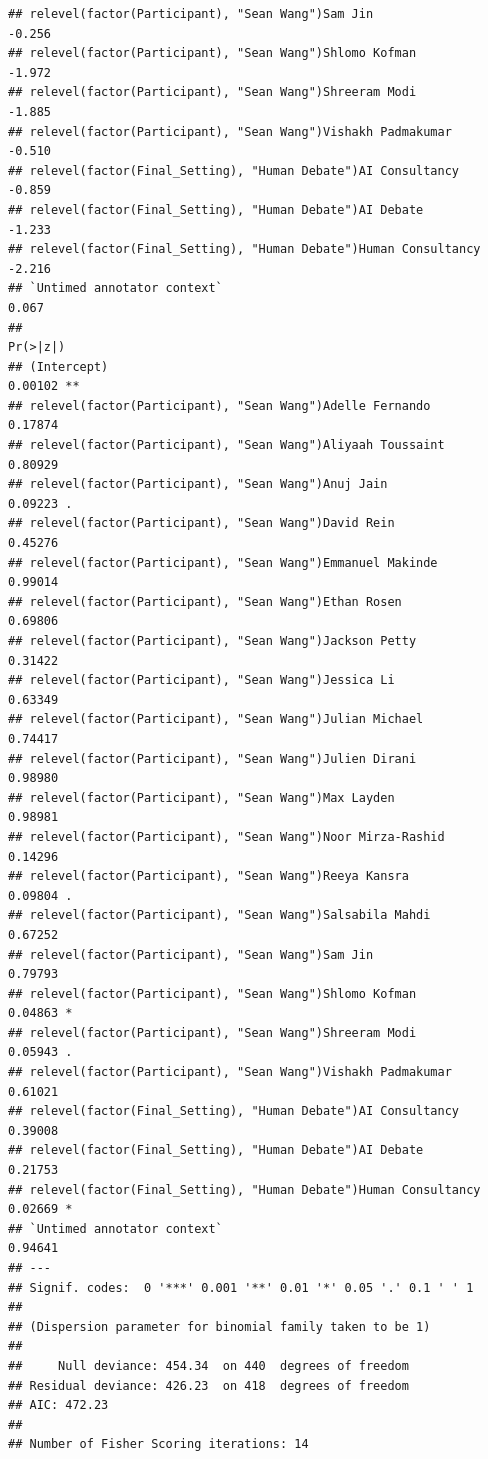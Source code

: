 \documentclass[
]{article}
\begin{document}
\begin{verbatim}
## relevel(factor(Participant), "Sean Wang")Sam Jin                 -0.256
## relevel(factor(Participant), "Sean Wang")Shlomo Kofman           -1.972
## relevel(factor(Participant), "Sean Wang")Shreeram Modi           -1.885
## relevel(factor(Participant), "Sean Wang")Vishakh Padmakumar      -0.510
## relevel(factor(Final_Setting), "Human Debate")AI Consultancy     -0.859
## relevel(factor(Final_Setting), "Human Debate")AI Debate          -1.233
## relevel(factor(Final_Setting), "Human Debate")Human Consultancy  -2.216
## `Untimed annotator context`                                       0.067
##                                                                 Pr(>|z|)   
## (Intercept)                                                      0.00102 **
## relevel(factor(Participant), "Sean Wang")Adelle Fernando         0.17874   
## relevel(factor(Participant), "Sean Wang")Aliyaah Toussaint       0.80929   
## relevel(factor(Participant), "Sean Wang")Anuj Jain               0.09223 . 
## relevel(factor(Participant), "Sean Wang")David Rein              0.45276   
## relevel(factor(Participant), "Sean Wang")Emmanuel Makinde        0.99014   
## relevel(factor(Participant), "Sean Wang")Ethan Rosen             0.69806   
## relevel(factor(Participant), "Sean Wang")Jackson Petty           0.31422   
## relevel(factor(Participant), "Sean Wang")Jessica Li              0.63349   
## relevel(factor(Participant), "Sean Wang")Julian Michael          0.74417   
## relevel(factor(Participant), "Sean Wang")Julien Dirani           0.98980   
## relevel(factor(Participant), "Sean Wang")Max Layden              0.98981   
## relevel(factor(Participant), "Sean Wang")Noor Mirza-Rashid       0.14296   
## relevel(factor(Participant), "Sean Wang")Reeya Kansra            0.09804 . 
## relevel(factor(Participant), "Sean Wang")Salsabila Mahdi         0.67252   
## relevel(factor(Participant), "Sean Wang")Sam Jin                 0.79793   
## relevel(factor(Participant), "Sean Wang")Shlomo Kofman           0.04863 * 
## relevel(factor(Participant), "Sean Wang")Shreeram Modi           0.05943 . 
## relevel(factor(Participant), "Sean Wang")Vishakh Padmakumar      0.61021   
## relevel(factor(Final_Setting), "Human Debate")AI Consultancy     0.39008   
## relevel(factor(Final_Setting), "Human Debate")AI Debate          0.21753   
## relevel(factor(Final_Setting), "Human Debate")Human Consultancy  0.02669 * 
## `Untimed annotator context`                                      0.94641   
## ---
## Signif. codes:  0 '***' 0.001 '**' 0.01 '*' 0.05 '.' 0.1 ' ' 1
## 
## (Dispersion parameter for binomial family taken to be 1)
## 
##     Null deviance: 454.34  on 440  degrees of freedom
## Residual deviance: 426.23  on 418  degrees of freedom
## AIC: 472.23
## 
## Number of Fisher Scoring iterations: 14
\end{verbatim}
\end{document}
